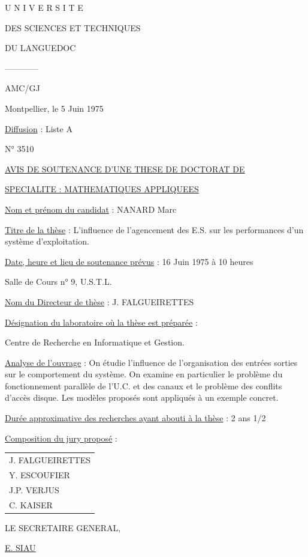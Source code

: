 U N I V E R S I T E\par
DES SCIENCES ET TECHNIQUES\par
DU LANGUEDOC\par
------------\par
AMC/GJ

Montpellier, le 5 Juin 1975

\uline{Diffusion} : Liste A\par
N° 3510

\uline{AVIS DE SOUTENANCE D'UNE THESE DE DOCTORAT DE}\par
\uline{SPECIALITE : MATHEMATIQUES APPLIQUEES}

\uline{Nom et prénom du candidat} : NANARD Marc

\uline{Titre de la thèse} : L'influence de l'agencement des E.S. sur les performances
d'un système d'exploitation.

\uline{Date, heure et lieu de soutenance prévus} : 16 Juin 1975 à 10 heures\par
Salle de Cours n° 9, U.S.T.L.

\uline{Nom du Directeur de thèse} : J. FALGUEIRETTES

\uline{Désignation du laboratoire où la thèse est préparée} :\par
Centre de Recherche en Informatique et Gestion.

\uline{Analyse de l'ouvrage} : On étudie l'influence de l'organisation des entrées
sorties sur le comportement du système. On examine en particulier le problème
du fonctionnement parallèle de l'U.C. et des canaux et le problème des conflits
d'accès disque. Les modèles proposés sont appliqués à un exemple concret.

\uline{Durée approximative des recherches ayant abouti à la thèse} : 2 ans 1/2

\uline{Composition du jury proposé} :\par
\begin{tabular}{l}J. FALGUEIRETTES\\Y. ESCOUFIER\\J.P. VERJUS\\C. KAISER\end{tabular}

LE SECRETAIRE GENERAL,

\uline{E. SIAU}

